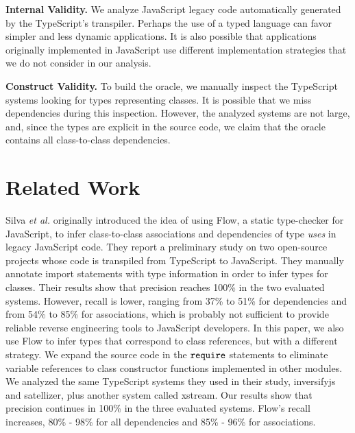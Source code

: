 \documentclass[review]{elsarticle}
\newcommand{\mcode}[1]{$\tt #1$}
\begin{document}
\noindent \textbf{Internal Validity.} We analyze JavaScript legacy code automatically generated by the TypeScript's transpiler. Perhaps the use of a typed language can favor simpler and less dynamic applications. It is also possible that applications originally implemented in JavaScript use different implementation strategies that we do not consider in our analysis. 

\vspace{1.5 mm}

\noindent \textbf{Construct Validity.} To build the oracle, we manually inspect the TypeScript systems looking for types representing classes. It is possible that we miss dependencies during this inspection. However, the analyzed systems are not large, and, since the types are explicit in the source code, we claim that the oracle contains all class-to-class dependencies.  



\section{Related Work}
\label{sec:related-work}

Silva \emph{et al.} \cite{sanerera2017} originally introduced the idea of using Flow, a static type-checker for JavaScript, to infer class-to-class associations and dependencies of type \textit{uses} in legacy JavaScript code. They report a preliminary study on two open-source projects whose code is transpiled from TypeScript to JavaScript. They manually annotate import statements with type information in order to infer types for classes. Their results show that precision reaches 100\% in the two evaluated systems. However, recall is lower, ranging from 37\% to 51\% for dependencies and from 54\% to 85\% for associations, which is probably not sufficient to provide reliable reverse engineering tools to JavaScript developers. In this paper, we also use Flow to infer types that correspond to class references, but with a different strategy. We expand the source code in the \mcode{require} statements to eliminate variable references to class constructor functions implemented in other modules. We analyzed the same TypeScript systems they used in their study, {\sc inversifyjs} and {\sc satellizer}, plus another system called {\sc xstream}. Our results show that precision continues in 100\% in the three evaluated systems. Flow's recall increases, 80\% - 98\% for all dependencies and 85\% - 96\% for associations.
\end{document}

